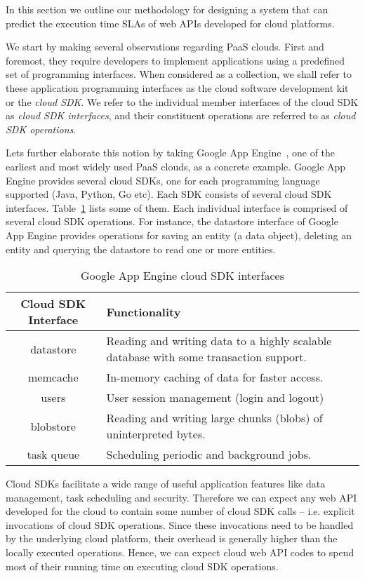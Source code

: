 In this section we outline our methodology for designing a system that can predict the execution
time SLAs of web APIs developed for cloud platforms.

We start by making several observations regarding PaaS clouds. First and foremost, 
they require developers
to implement applications using a predefined set of programming interfaces. When considered as a
collection, we shall refer to these application programming interfaces as the cloud software development 
kit or the \textit{cloud SDK}. We refer to the individual member interfaces of the cloud SDK
as \textit{cloud SDK interfaces}, and their constituent operations are referred to as \textit{cloud SDK operations}.

Lets further elaborate this notion by taking Google App Engine~\cite{gae}, one of the earliest and most widely
used PaaS clouds, as a concrete example. Google App Engine provides several cloud SDKs, one for each
programming language supported (Java, Python, Go etc). Each SDK consists of
several cloud SDK interfaces. Table~\ref{tab:gae_cloud_sdk} lists some of them.
Each individual interface is comprised of several cloud SDK operations. For instance, the 
datastore interface of Google App Engine provides operations for saving an entity (a data object),
deleting an entity and querying the datastore to read one or more entities.

\begin{table}[htdp]
\caption{Google App Engine cloud SDK interfaces}
\begin{center}
\begin{tabular}{|c|p{5cm}|}
\hline
Cloud SDK Interface & Functionality \\ \hline
datastore & Reading and writing data to a highly scalable database with some transaction support. \\ \hline
memcache & In-memory caching of data for faster access.\\ \hline
users & User session management (login and logout)\\ \hline
blobstore & Reading and writing large chunks (blobs) of uninterpreted bytes.\\ \hline
task queue & Scheduling periodic and background jobs.\\ \hline
\end{tabular}
\end{center}
\label{tab:gae_cloud_sdk}
\end{table}

Cloud SDKs facilitate a wide range of useful application features like data management, 
task scheduling and security. Therefore we can expect any web API developed for the cloud to
contain some number of cloud SDK calls -- i.e.
explicit invocations of cloud SDK operations. Since these invocations need to be handled by the
underlying cloud platform, their overhead is generally higher than the locally executed operations.
Hence, we can expect cloud web API codes to spend most of their running time on executing cloud
SDK operations. 

